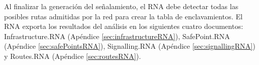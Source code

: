 	Al finalizar la generación del señalamiento, el RNA debe detectar todas las posibles rutas admitidas por la red para crear la tabla de enclavamientos. El RNA exporta los resultados del análisis en los siguientes cuatro documentos: Infrastructure.RNA (Apéndice \ref{sec:infrastructureRNA}), SafePoint.RNA (Apéndice \ref{sec:safePointsRNA}), Signalling.RNA (Apéndice \ref{sec:signallingRNA}) y Routes.RNA (Apéndice \ref{sec:routesRNA}).